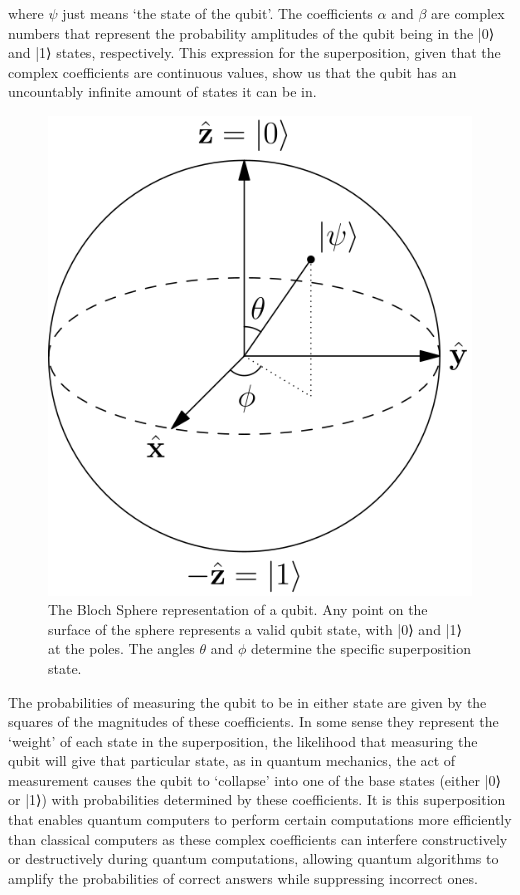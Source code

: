 \documentclass{elbioimp2}
\begin{document}
where $\psi$ just means `the state of the qubit'. The coefficients $\alpha$ and $\beta$ are complex numbers that represent the probability amplitudes of the qubit being in the |0⟩ and |1⟩ states, respectively. This expression for the superposition, given that the complex coefficients are continuous values, show us that the qubit has an uncountably infinite amount of states it can be in. 
\begin{figure}[htbp]
  \centering
  \includegraphics[width=0.75\columnwidth]{assets/bloch-sphere.png}
  \caption{The Bloch Sphere representation of a qubit. Any point on the surface of the sphere represents a valid qubit state, with |0⟩ and |1⟩ at the poles. The angles $\theta$ and $\phi$ determine the specific superposition state.}
  \label{fig:bloch-sphere}
\end{figure}
The probabilities of measuring the qubit to be in either state are given by the squares of the magnitudes of these coefficients. In some sense they represent the `weight' of each state in the superposition, the likelihood that measuring the qubit will give that particular state, as in quantum mechanics, the act of measurement causes the qubit to `collapse' into one of the base states (either |0⟩ or |1⟩) with probabilities determined by these coefficients. It is this superposition that enables quantum computers to perform certain computations more efficiently than classical computers as these complex coefficients can interfere constructively or destructively during quantum computations, allowing quantum algorithms to amplify the probabilities of correct answers while suppressing incorrect ones.
\end{document}
